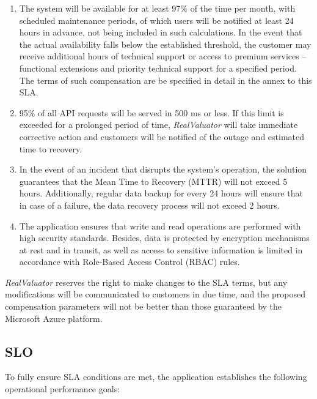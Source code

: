 \documentclass{article}
\begin{document}
\begin{enumerate}
    \item The system will be available for at least 97\% of the time per month, with scheduled maintenance periods, of which users will be notified at least 24 hours in advance, not being included in such calculations.
    In the event that the actual availability falls below the established threshold, the customer may receive additional hours of technical support or access to premium services -- functional extensions and priority technical support for a specified period. The terms of such compensation are be specified in detail in the annex to this SLA.

    \item 95\% of all API requests will be served in 500 ms or less. If this limit is exceeded for a prolonged period of time, \textit{RealValuator} will take immediate corrective action and customers will be notified of the outage and estimated time to recovery.

    \item In the event of an incident that disrupts the system's operation, the solution guarantees that the Mean Time to Recovery (MTTR) will not exceed 5 hours. Additionally, regular data backup for every 24 hours will ensure that in case of a failure, the data recovery process will not exceed 2 hours.

    \item The application ensures that write and read operations are performed with high security standards. Besides, data is protected by encryption mechanisms at rest and in transit, as well as access to sensitive information is limited in accordance with Role-Based Access Control (RBAC) rules.
\end{enumerate}

\textit{RealValuator} reserves the right to make changes to the SLA terms, but any modifications will be communicated to customers in due time, and the proposed compensation parameters will not be better than those guaranteed by the Microsoft Azure platform.

\subsection{SLO}
To fully ensure SLA conditions are met, the application establishes the following operational performance goals:
\end{document}
